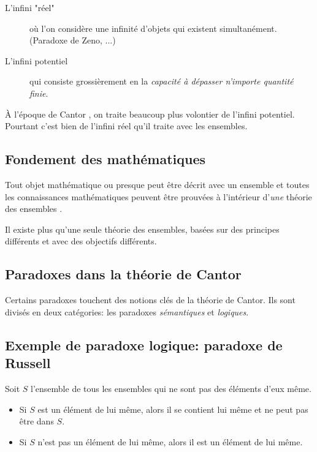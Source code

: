 \documentclass[fleqn,a4paper,nobib]{tufte-handout}
\begin{document}
\begin{description}
    \item[L'infini "réel"] où l'on considère une infinité
    d'objets qui existent simultanément. (Paradoxe de Zeno,
    ...)
    \item[L'infini potentiel] qui consiste grossièrement en la
    \emph{capacité à dépasser n'importe quantité finie}.
\end{description}

À l'époque de Cantor
,
on traite beaucoup plus volontier de l'infini potentiel.
Pourtant c'est bien de l'infini réel qu'il traite avec
les ensembles.

\subsection{Fondement des mathématiques}


Tout objet mathématique ou presque peut être décrit avec un ensemble et
toutes les connaissances mathématiques peuvent être prouvées à l'intérieur
d'\textit{une} théorie des ensembles
.

Il existe plus qu'une seule théorie des ensembles, basées sur
des principes différents et avec des objectifs différents.


\subsection{Paradoxes dans la théorie de Cantor}

Certains paradoxes touchent des notions clés de la théorie de Cantor.
Ils sont divisés en deux catégories: les paradoxes \textit{sémantiques}
et \textit{logiques}.

\subsection*{Exemple de paradoxe logique: paradoxe de Russell}

Soit $S$ l'ensemble de tous les ensembles qui ne sont pas des éléments
d'eux même.

\begin{itemize}
    \item Si $S$ est un élément de lui même, alors il se contient lui
    même et ne peut pas être dans \(S\).
    \item Si $S$ n'est pas un élément de lui même,
    alors il est un élément de lui même.
\end{itemize}
\end{document}
